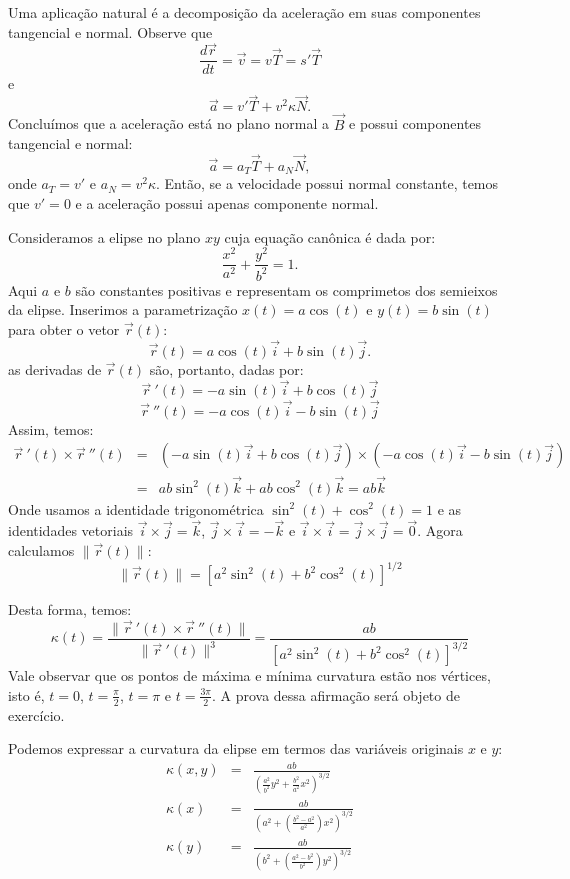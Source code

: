 \begin{obs}Uma aplicação natural é a decomposição da aceleração em suas componentes tangencial e normal. Observe que
$$
\frac{d\vec{r}}{dt}=\vec{v}=v\vec{T}=s' \vec{T}
$$
e
$$
\vec{a}=v' \vec{T}+v^2 \kappa \vec{N}.
$$
Concluímos que a aceleração está no plano normal a $\vec{B}$ e possui componentes tangencial e normal:
$$
\vec{a}=a_T \vec{T}+a_N \vec{N},
$$
onde $a_T=v'$ e $a_N=v^2\kappa$. Então, se a velocidade possui normal constante, temos que $v'=0$ e a aceleração possui apenas componente normal.

\end{obs}

\begin{ex} \label{ex_calculo_curvatura_elipse}Consideramos a elipse no plano $xy$ cuja equação canônica é dada por:
  $$\frac{x^2}{a^2} + \frac{y^2}{b^2} = 1. $$
  Aqui $a$ e $b$ são constantes positivas e representam os comprimetos dos semieixos da elipse.
  Inserimos a parametrização $x(t)=a\cos(t)$ e $y(t)=b\sin(t)$ para obter o vetor $\vec{r}(t)$:
  $$\vec{r}(t) = a\cos(t)\vec{i} + b\sin(t)\vec{j}.$$
  as derivadas de $\vec{r}(t)$ são, portanto, dadas por:
$$\vec{r}~\!'(t)=-a\sin(t)\vec{i}+b\cos(t)\vec{j}$$
$$\vec{r}~\!''(t)=-a\cos(t)\vec{i}-b\sin(t)\vec{j}$$
Assim, temos:
\begin{eqnarray*}\vec{r}~\!'(t)\times\vec{r}~\!''(t)&=&\left(-a\sin(t)\vec{i}+b\cos(t)\vec{j}\right)\times\left(-a\cos(t)\vec{i}-b\sin(t)\vec{j}\right)\\
&=&ab\sin^2(t)\vec{k}+ab\cos^2(t)\vec{k}=ab\vec{k}
\end{eqnarray*}
Onde usamos a identidade trigonométrica $\sin^2(t)+\cos^2(t)=1$ e as identidades vetoriais $\vec{i}\times\vec{j}=\vec{k}$, $\vec{j}\times\vec{i}=-\vec{k}$  e $\vec{i}\times\vec{i}=\vec{j}\times\vec{j}=\vec{0}$.
Agora calculamos $\|\vec{r}(t)\|$:
$$\|\vec{r}(t)\|=\left[a^2\sin^2(t)+b^2\cos^2(t)\right]^{1/2}$$

Desta forma, temos:
$$\kappa(t)=\frac{\|\vec{r}~\!'(t)\times \vec{r}~\!''(t)\|}{\|\vec{r}~\!'(t)\|^3}=\frac{ab}{\left[a^2\sin^2(t)+b^2\cos^2(t)\right]^{3/2}}$$
Vale observar que os pontos de máxima e mínima curvatura estão nos vértices, isto é, $t=0$, $t=\frac{\pi}{2}$, $t=\pi$ e $t=\frac{3\pi}{2}$. A prova dessa afirmação será objeto de exercício.

Podemos expressar a curvatura da elipse em termos das variáveis originais $x$ e $y$:
\begin{eqnarray*}
\kappa(x, y)&=&\frac{ab}{\left(\frac{a^2}{b^2}y^2+\frac{b^2}{a^2}x^2\right)^{3/2}}\\
\kappa(x)&=&\frac{ab}{\left(a^2+\left(\frac{b^2-a^2}{a^2}\right)x^2\right)^{3/2}}\\
\kappa(y)&=&\frac{ab}{\left(b^2+\left(\frac{a^2-b^2}{b^2}\right)y^2\right)^{3/2}}\\
\end{eqnarray*}
\end{ex}


